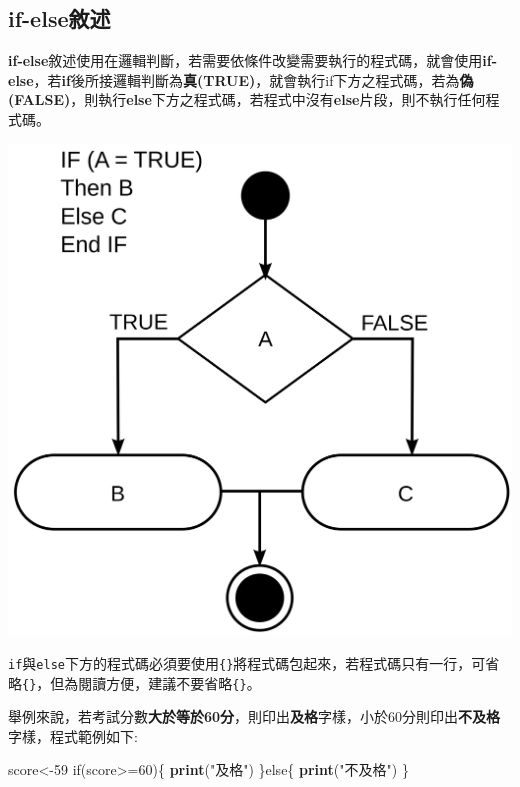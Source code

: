 \documentclass[]{book}
\newenvironment{Shaded}{\begin{snugshade}}{\end{snugshade}}
\newcommand{\KeywordTok}[1]{\textcolor[rgb]{0.13,0.29,0.53}{\textbf{{#1}}}}
\newcommand{\DecValTok}[1]{\textcolor[rgb]{0.00,0.00,0.81}{{#1}}}
\newcommand{\StringTok}[1]{\textcolor[rgb]{0.31,0.60,0.02}{{#1}}}
\newcommand{\NormalTok}[1]{{#1}}
\theoremstyle{definition}
\theoremstyle{definition}
\theoremstyle{remark}
\begin{document}
\subsection{if-else敘述}\label{if-else}

\textbf{if-else}敘述使用在邏輯判斷，若需要依條件改變需要執行的程式碼，就會使用\textbf{if-else}，若\textbf{if}後所接邏輯判斷為\textbf{真(TRUE)}，就會執行if下方之程式碼，若為\textbf{偽(FALSE)}，則執行\textbf{else}下方之程式碼，若程式中沒有\textbf{else}片段，則不執行任何程式碼。

\includegraphics[width=27.78in]{figure/ifelse}

\texttt{if}與\texttt{else}下方的程式碼必須要使用\texttt{\{\}}將程式碼包起來，若程式碼只有一行，可省略\texttt{\{\}}，但為閱讀方便，建議不要省略\texttt{\{\}}。

舉例來說，若考試分數\textbf{大於等於60分}，則印出\textbf{及格}字樣，小於60分則印出\textbf{不及格}字樣，程式範例如下:

\begin{Shaded}
\begin{Highlighting}[]
\NormalTok{score<-}\DecValTok{59}
\NormalTok{if(score>=}\DecValTok{60}\NormalTok{)\{}
  \KeywordTok{print}\NormalTok{(}\StringTok{"及格"}\NormalTok{)}
\NormalTok{\}else\{}
  \KeywordTok{print}\NormalTok{(}\StringTok{"不及格"}\NormalTok{)}
\NormalTok{\}}
\end{Highlighting}
\end{Shaded}
\end{document}
